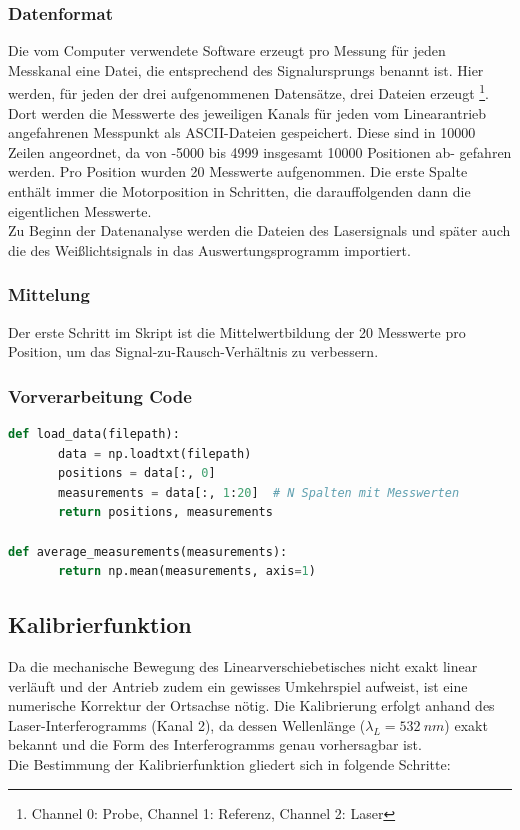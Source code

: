 \documentclass[10pt,a4paper]{article}
\begin{document}
\subsubsection{Datenformat}
Die vom Computer verwendete Software erzeugt pro Messung für jeden Messkanal eine Datei, die entsprechend des Signalursprungs benannt ist. Hier werden, für jeden der drei aufgenommenen Datensätze, drei Dateien erzeugt \footnote{Channel 0: Probe, Channel 1: Referenz, Channel 2: Laser}. 
Dort werden die Messwerte des jeweiligen Kanals für jeden vom Linearantrieb angefahrenen Messpunkt als ASCII-Dateien gespeichert. Diese sind in 10000 Zeilen angeordnet, da von -5000 bis 4999 insgesamt 10000 Positionen ab- gefahren werden. Pro Position wurden 20 Messwerte aufgenommen. Die erste Spalte enthält immer die Motorposition in Schritten, die darauffolgenden dann die eigentlichen Messwerte.\\
Zu Beginn der Datenanalyse werden die Dateien des Lasersignals und später auch die des Weißlichtsignals in das Auswertungsprogramm importiert.

\subsubsection{Mittelung}
Der erste Schritt im Skript ist die Mittelwertbildung der 20 Messwerte pro Position, um das Signal-zu-Rausch-Verhältnis zu verbessern.

\subsubsection{Vorverarbeitung Code}

\begin{lstlisting}[language=Python, caption=Vorverarbeitung]
def load_data(filepath):
       data = np.loadtxt(filepath)
       positions = data[:, 0]
       measurements = data[:, 1:20]  # N Spalten mit Messwerten
       return positions, measurements
   
def average_measurements(measurements):
       return np.mean(measurements, axis=1)
\end{lstlisting}


\subsection{Kalibrierfunktion}
Da die mechanische Bewegung des Linearverschiebetisches nicht exakt linear verläuft und der Antrieb zudem ein gewisses Umkehrspiel aufweist, ist eine numerische Korrektur der Ortsachse nötig. Die Kalibrierung erfolgt anhand des Laser-Interferogramms (Kanal 2), da dessen Wellenlänge ($\lambda_{L}=\qty{532}{nm}$) exakt bekannt und die Form des Interferogramms genau vorhersagbar ist.\\
Die Bestimmung der Kalibrierfunktion gliedert sich in folgende Schritte:
\end{document}
